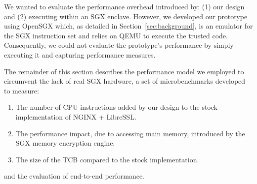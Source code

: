 \documentclass[../../main.tex]{subfiles}
\begin{document}
We wanted to evaluate the performance overhead introduced by: (1) our design
and (2) executing within an SGX enclave. However, we developed our prototype
using OpenSGX which, as detailed in Section~\ref{sec:background}, is an
emulator for the SGX instruction set and relies on QEMU to execute the trusted
code. Consequently, we could not evaluate the prototype's performance by
simply executing it and capturing performance measures.

The remainder of this section describes the performance model we employed to
circumvent the lack of real SGX hardware, a set of microbenchmarks developed
to measure:
\begin{enumerate}
  \item The number of CPU instructions added by our design to the
    stock implementation of NGINX + LibreSSL.
  \item The performance impact, due to accessing main memory, introduced by
    the SGX memory encryption engine.
  \item The size of the TCB compared to the stock implementation.
\end{enumerate}
and the evaluation of end-to-end performance.
\end{document}
